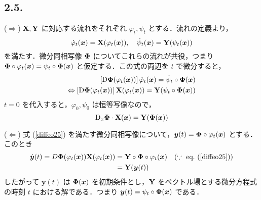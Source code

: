 \documentclass[a4paper,11pt,uplatex]{jsarticle}
\begin{document}
\maketitle
\subsection{2.5.}

($\Rightarrow$) ${\bf X}, {\bf Y}$ に対応する流れをそれぞれ ${\varphi}_t, {\psi}_t$ とする．流れの定義より，
\begin{equation}
    \dot{\varphi}_t({\bm x}) = {\bf X}({\varphi}_t({\bm x})), \quad \dot{\psi}_t({\bm x}) = {\bf Y}({\psi}_t({\bm x})) \label{eq: flow}
\end{equation}
を満たす．微分同相写像 ${\bf \Phi}$ についてこれらの流れが共役，つまり
${\bf \Phi} \circ {\varphi}_t ({\bm x}) = {\psi}_t \circ {\bf \Phi}({\bm x})$ と仮定する．この式の両辺を $t$ で微分すると，
\begin{align}
    \left[ {\mathrm D}{\bf \Phi}({\varphi}_t({\bm x})) \right]\dot{\varphi}_t({\bm x}) = \dot{\psi}_t \circ {\bf \Phi}({\bm x}) \nonumber \\
    \Leftrightarrow \left[ {\mathrm D}{\bf \Phi}({\varphi}_t({\bm x})) \right]{\bf X}({\varphi}_t({\bm x})) = {\bf Y}({\psi}_t \circ {\bf \Phi}({\bm x}))
\end{align}
$t=0$ を代入すると，${\varphi}_0, {\psi}_0$ は恒等写像なので，
\begin{equation}
    {\rm D}_x{\bf \Phi}\cdot {\bf X}({\bm x}) = {\bf Y}({\bf \Phi}({\bm x})) \label{diffeo25}
\end{equation}

($\Leftarrow$) 式 (\ref{diffeo25}) を満たす微分同相写像について，${\bm y}(t) = {\bf \Phi}\circ {\varphi}_t ({\bm x})$ とする．このとき
\begin{align}
    \dot{\bm y}(t) = D{\bf \Phi}({\varphi}_t({\bm x})){\bf X}({\varphi}_t({\bm x})) &= {\bf Y}\circ {\bf \Phi} \circ {\varphi}_t ({\bm x}) \quad (\because \ \text{eq.~}(\ref{diffeo25})) \nonumber \\
    &= {\bf Y}({\bm y}(t))
\end{align}
したがって ${\bm y}(t)$ は ${\bf \Phi}({\bm x})$ を初期条件とし，${\bf Y}$ をベクトル場とする微分方程式の時刻 $t$ における解である．つまり ${\bm y} (t)= {\psi}_t \circ {\bf \Phi}({\bm x})$ である．
\end{document}
